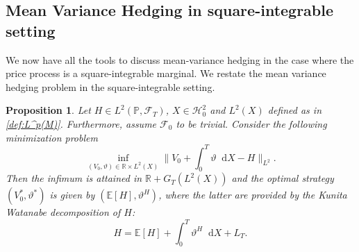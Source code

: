 \documentclass[11pt,a4paper,twoside,openany]{report}
\newcommand{\diff}{\mathop{}\!\mathrm{d}}
\theoremstyle{plain} %
\newtheorem{proposition}[proposition]{Proposition}
\theoremstyle{definition} %
\theoremstyle{remark} %
\begin{document}
\subsection{Mean Variance Hedging in square-integrable setting}\label{sec:Mean Variance Hedging in square-integrable setting}
We now have all the tools to discuss mean-variance hedging in the case where the price process is a square-integrable marginal. We restate the mean variance hedging problem in the square-integrable setting.
\begin{proposition}\label{prop:square-integrable mean variance via KW}
    Let \(H\in L^2(\mathbb{P},\mathcal{F}_{T})\), \(X\in\mathcal{H}_{0}^2\) and \(L^2(X)\) defined as in \cref{def:L^p(M)}. Furthermore, assume \(\mathcal{F}_0\) to be trivial.
    Consider the following minimization problem
    \begin{equation}\label{eq:square-integrable mean square hedging}
        \inf_{(V_0,\vartheta)\in \mathbb{R}\times L^2(X)}\lVert V_0+\int_{0}^{T}\vartheta\diff X-H\rVert_{L^2}.
    \end{equation}
    Then the infimum is attained in \(\mathbb{R}+G_T(L^2(X))\) and the optimal strategy \((V_0^*,\vartheta^*)\) is given by \((\mathbb{E}[H],\vartheta^H)\), where the latter are provided by the Kunita Watanabe decomposition of \(H\):
    \begin{equation}\label{eq:KW of H}
        H = \mathbb{E}[H]+\int_0^T\vartheta^H\diff X+L_T.
    \end{equation}
\end{proposition}
\end{document}
